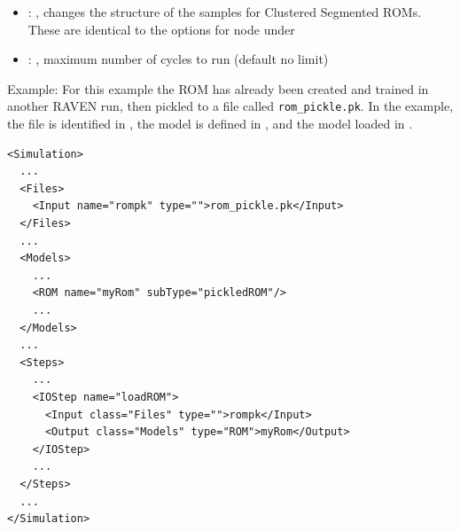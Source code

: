 \begin{itemize}
    \item {}: ,
      changes the structure of the samples for Clustered
      Segmented ROMs. These are identical to the options for 
      node under 

    \item {}: ,
      maximum number of cycles to run (default no limit)
  \end{itemize}

\hspace{24pt}
Example:
For this example the ROM has already been created and trained in another RAVEN run, then pickled to a file
called \texttt{rom\_pickle.pk}.  In the example, the file is identified in , the model is
defined in , and the model loaded in .
\begin{lstlisting}[style=XML]
<Simulation>
  ...
  <Files>
    <Input name="rompk" type="">rom_pickle.pk</Input>
  </Files>
  ...
  <Models>
    ...
    <ROM name="myRom" subType="pickledROM"/>
    ...
  </Models>
  ...
  <Steps>
    ...
    <IOStep name="loadROM">
      <Input class="Files" type="">rompk</Input>
      <Output class="Models" type="ROM">myRom</Output>
    </IOStep>
    ...
  </Steps>
  ...
</Simulation>
\end{lstlisting}


